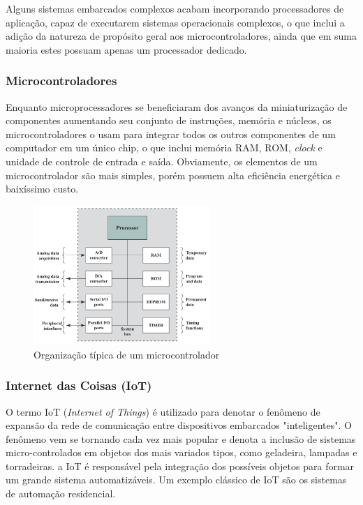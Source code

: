 \documentclass{article}
\begin{document}
Alguns sistemas embarcados complexos acabam incorporando processadores de
aplicação, capaz de executarem sistemas operacionais complexos, o que inclui a
adição da natureza de propósito geral aos microcontroladores, ainda que em suma
maioria estes possuam apenas um processador dedicado.

\subsubsection{Microcontroladores}
Enquanto microprocessadores se beneficiaram dos avanços da miniaturização de
componentes aumentando seu conjunto de instruções, memória e núcleos, os
microcontroladores o usam para integrar todos os outros componentes de um
computador em um único chip, o que inclui memória RAM, ROM, \textit{clock} e
unidade de controle de entrada e saída. Obviamente, os elementos de um
microcontrolador são mais simples, porém possuem alta eficiência energética e
baixíssimo custo.

\begin{figure}[h]
    \centering
    \includegraphics[width=0.6\textwidth]{uc.png}
    \caption{Organização típica de um microcontrolador}
\end{figure}

\subsubsection{Internet das Coisas (IoT)}
O termo IoT (\textit{Internet of Things}) é utilizado para denotar o fenômeno de
expansão da rede de comunicação entre dispositivos embarcados "inteligentes". O
fenômeno vem se tornando cada vez mais popular e denota a inclusão de sistemas
micro-controlados em objetos dos mais variados tipos, como geladeira, lampadas e
torradeiras. a IoT é responsável pela integração dos possíveis objetos para
formar um grande sistema automatizáveis. Um exemplo clássico de IoT são os
sistemas de automação residencial.
\end{document}
